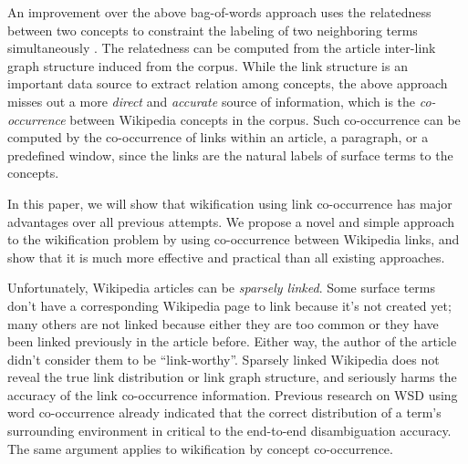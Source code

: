 An improvement over the above bag-of-words approach
uses the relatedness between two concepts to constraint
the labeling of two neighboring terms simultaneously
\cite{Tonelli2012,RatinovRDA11,kulkarni2009collective}. %
The relatedness can be computed from the article inter-link graph structure
induced from the corpus\cite{ferragina2010tagme}.%
While the link structure is an important data source to extract
relation among concepts, the above approach misses out a more
{\em direct} and {\em accurate} source of information,
which is the {\em co-occurrence} between Wikipedia concepts in the corpus.
Such co-occurrence can be computed
by the co-occurrence of links within an article, a paragraph, or a predefined window,
since the links are the natural labels of surface terms to the concepts.

In this paper, we will show that wikification using link co-occurrence has
major advantages over all previous attempts.
We propose a novel and simple approach to the wikification problem
by using co-occurrence between Wikipedia links, and show that it is
much more effective and practical than all existing approaches.



Unfortunately, Wikipedia articles can be {\em sparsely linked}.
Some surface terms don't have a corresponding Wikipedia page
to link because it's not created yet; many others are not linked because either
they are too common or they have been linked previously in the article before.
Either way, the author of the article didn't consider them to be
``link-worthy''. Sparsely linked Wikipedia does not reveal the true
link distribution or link graph structure, and seriously harms
the accuracy of the link co-occurrence information.
Previous research on WSD using word
co-occurrence \cite{Stokoe2003:WSD} already indicated that
the correct distribution of a term's surrounding environment in
critical to the end-to-end disambiguation accuracy.
The same argument applies to wikification by concept co-occurrence.

